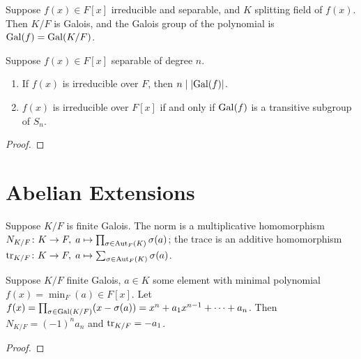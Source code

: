 
\begin{definition}
    Suppose \(f(x) \in F[x]\) irreducible and separable,
    and \(K\) splitting field of \(f(x)\).
    Then \(K/F\) is Galois,
    and the Galois group of the polynomial is \(\operatorname{Gal}(f) = \operatorname{Gal}(K/F)\).
\end{definition}
\begin{theorem}
    Suppose \(f(x) \in F[x]\) separable of degree \(n\).
    \begin{enumerate}[label={(\alph*)}, itemsep=0mm]
        \item If \(f(x)\) is irreducible over \(F\),
            then \(n \mid \abs{\operatorname{Gal}(f)}\).
        \item \(f(x)\) is irreducible over \(F[x]\)
            if and only if \(\operatorname{Gal}(f)\) is a transitive subgroup of \(S_n\).
    \end{enumerate}
\end{theorem}
\begin{proof}
\end{proof}


\section{Abelian Extensions}

\begin{definition}
    Suppose \(K/F\) is finite Galois.
    The norm is a multiplicative homomorphism
    \(N_{K/F}\colon K\to F,\;a\mapsto\prod_{\sigma\in\operatorname{Aut}_F(K)} \sigma(a)\);
    the trace is an additive homomorphism
    \(\tr_{K/F}\colon K\to F,\;a\mapsto\sum_{\sigma\in\operatorname{Aut}_F(K)} \sigma(a)\).
\end{definition}
\begin{proposition}
    Suppose \(K/F\) finite Galois,
    \(a \in K\) some element with minimal polynomial \(f(x) = \min_F(a) \in F[x]\).
    Let \(f(x) = \prod_{\sigma\in\operatorname{Gal}(K/F)} (x-\sigma(a)) = x^n + a_1 x^{n-1} + \cdots + a_n\).
    Then \(N_{K/F} = {(-1)}^n a_n\)  and \(\tr_{K/F} = -a_1\).
\end{proposition}
\begin{proof}
\end{proof}

